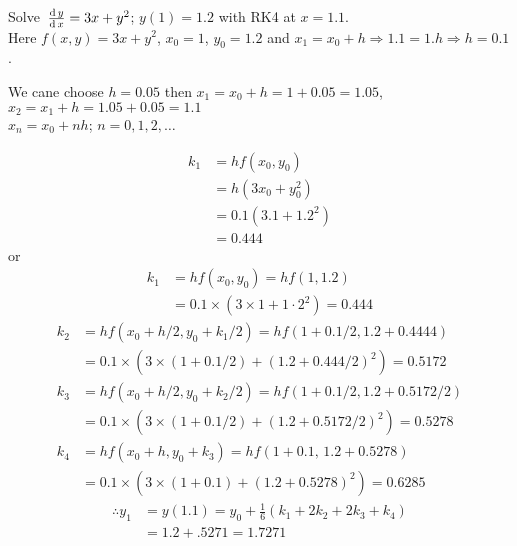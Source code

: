 \documentclass[../main-sheet.tex]{subfiles}
\begin{document}
\begin{ex}
    Solve \(\,\frac{\mathrm{d}\,y}{\mathrm{d}\,x}=3x+y^2\); \(y(1)=1.2\) with RK4 at \(x=1.1\).\\
    

    Here \(f(x,y)=3x+y^2\), \(x_0=1\), \(y_0=1.2\) and \(x_1=x_0+h\Rightarrow 1.1=1.h\Rightarrow h=0.1\).
    \begin{note}
        We cane choose \(h=0.05\) then \(x_1=x_0+h=1+0.05=1.05\), \(x_2=x_1+h=1.05+0.05=1.1\)\\
        \(x_n=x_0+nh\); \(n=0,1,2,\dots\)
    \end{note}
    \begin{align*}
        k_1&=hf(x_0,y_0)\\
        &=h(3x_0+y_0^2)\\
        &=0.1(3.1+1.2^2)\\
        &=0.444
    \end{align*}
    or
    \begin{align*}
        k_1&=hf(x_0,y_0)=hf(1,1.2)\\
        &=0.1\times (3\times 1+1\cdot2^2)=0.444
    \end{align*}
    \begin{align*}
        k_2&=hf(x_0+h/2,y_0+k_1/2)=hf(1+0.1/2,1.2+0.4444)\\
        &=0.1\times (3\times (1+0.1/2)+(1.2+0.444/2)^2)=0.5172\\
        k_3&=hf(x_0+h/2,y_0+k_2/2)=hf(1+0.1/2,1.2+0.5172/2)\\
        &=0.1\times (3\times (1+0.1/2)+(1.2+0.5172/2)^2)=0.5278\\
        k_4&=hf(x_0+h,y_0+k_3)=hf(1+0.1,\,1.2+0.5278)\\
        &=0.1\times (3\times (1+0.1)+(1.2+0.5278)^2)=0.6285
    \end{align*}
    \begin{align*}
        \therefore y_1&=y(1.1)=y_0+\frac{1}{6}(k_1+2k_2+2k_3+k_4)\\
        &=1.2+.5271=1.7271
    \end{align*}
\end{ex}
\end{document}
